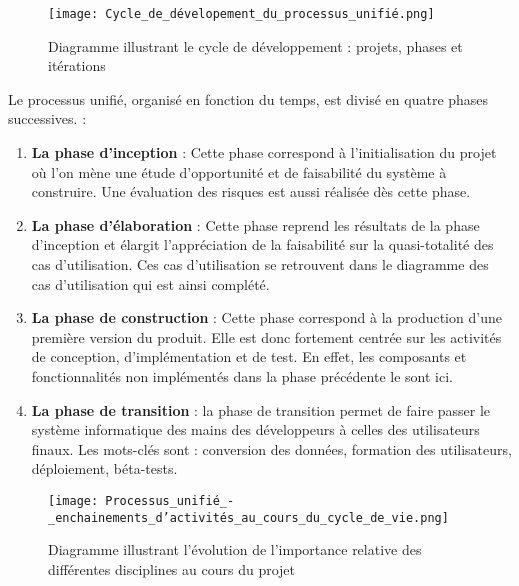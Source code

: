             \begin{figure}[H]
                \centering
                \texttt{[image: Cycle\_de\_dévelopement\_du\_processus\_unifié.png]}
                \caption{Diagramme illustrant le cycle de développement :
                projets, phases et itérations}
                \label{fig:CycleDeDev}
            \end{figure}
            Le processus unifié, organisé en fonction du temps, est divisé en quatre phases
            successives. \cite{gabay2008uml} :
            \par
            \begin{enumerate}
                \setlength{\itemsep}{0pt}
                \item \textbf{La phase d'inception} : Cette phase correspond à l’initialisation du
                projet où l’on mène une étude d’opportunité et de faisabilité du système
                à construire. Une évaluation des risques est aussi réalisée dès cette phase.
                \item \textbf{La phase d’élaboration} : Cette phase reprend les résultats de
                la phase d'inception et élargit l’appréciation de la faisabilité sur la quasi-totalité
                des cas d’utilisation. Ces cas d’utilisation se retrouvent dans le diagramme
                des cas d’utilisation qui est ainsi complété.
                \item \textbf{La phase de construction} : Cette phase correspond à la production
                d’une première version du produit. Elle est donc fortement centrée sur les activités
                de conception, d’implémentation et de test. En effet, les composants et
                fonctionnalités non implémentés dans la phase précédente le sont ici.
                \item \textbf{La phase de transition} : la phase de transition permet de faire
                passer le système informatique des mains des développeurs à celles des utilisateurs finaux.
                Les mots-clés sont : conversion des données, formation des utilisateurs,
                déploiement, béta-tests. \cite{Roques2008}
            \end{enumerate}
            \begin{figure}[H]
                \centering
                \texttt{[image: Processus\_unifié\_-\_enchainements\_d'activités\_au\_cours\_du\_cycle\_de\_vie.png]}
                \caption{Diagramme illustrant l’évolution de l’importance
                relative des différentes disciplines au cours du projet}
                \label{fig:UpsProfil}
            \end{figure}
            
